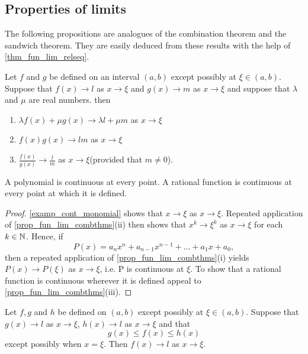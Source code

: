 \documentclass[10pt, a4paper]{article}
\begin{document}
\subsection{Properties of limits}
The following propositions are analogues of the combination theorem and the sandwich theorem. They are easily deduced from these results with the help of \autoref{thm_fun_lim_relseq}.
\begin{proposition}\label{prop_fun_lim_combthms}
    Let $f$ and $g$ be defined on an interval $(a, b)$ except possibly at $\xi \in (a, b)$. Suppose that $f(x) \rightarrow l$ as $x \rightarrow \xi$ and $g(x) \rightarrow m$ as $x \rightarrow \xi$ and suppose that $\lambda$ and $\mu$ are real numbers. then
    \begin{enumerate}[label = (\roman*)]
        \item $\lambda f(x) + \mu g(x) \rightarrow \lambda l + \mu m$ as $x \rightarrow \xi$
        \item $f(x)g(x) \rightarrow lm$ as $x \rightarrow \xi$
        \item $\frac{f(x)}{g(x)} \rightarrow \frac{l}{m}$ as $x \rightarrow \xi$\quad(provided that $m \neq 0$).
    \end{enumerate}
\end{proposition}

\begin{theorem}
    A polynomial is continuous at every point. A rational function is continuous at every point at which it is defined.
    \begin{proof}
        \autoref{examp_cont_monomial} shows that $x \rightarrow \xi$ as $x \rightarrow \xi$. Repeated application of \autoref{prop_fun_lim_combthms}(ii) then shows that $x ^ k \rightarrow \xi ^ k$ as $x \rightarrow \xi$ for each $k \in \mathbb{N}$. Hence, if
        $$P(x) = a_n x ^ n + a_{n - 1} x ^ {n - 1} + \dotsc + a_1 x + a_0,$$
        then a repeated application of \autoref{prop_fun_lim_combthms}(i) yields $P(x) \rightarrow P(\xi)$ as $x \rightarrow \xi$, i.e. P is continuous at $\xi$. To show that a rational function is continuous wherever it is defined appeal to \autoref{prop_fun_lim_combthms}(iii).
    \end{proof}
\end{theorem}

\begin{proposition}
    Let $f, g$ and $h$ be defined on $(a, b)$ except possibly at $\xi \in (a, b)$. Suppose that $g(x) \rightarrow l$ as $x \rightarrow \xi$, $h(x) \rightarrow l$ as $x \rightarrow \xi$ and that
    $$g(x) \leq f(x) \leq h(x)$$
    except possibly when $x = \xi$. Then $f(x) \rightarrow l$ as $x \rightarrow \xi$.
\end{proposition}
\end{document}
